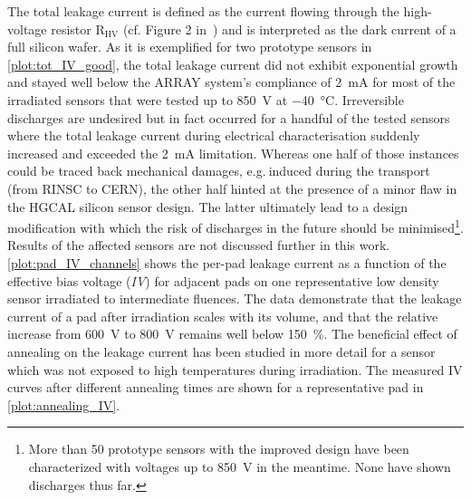 The total leakage current is defined as the current flowing through the high-voltage resistor R$_\text{HV}$ (cf. Figure 2 in~\cite{pitters:array2019}) and is interpreted as the dark current of a full silicon wafer.
As it is exemplified for two prototype sensors in \ref{plot:tot_IV_good}, the total leakage current did not exhibit exponential growth and stayed well below the ARRAY system's compliance of \SI{2}{\milli\ampere} for most of the irradiated sensors that were tested up to \SI{850}{\volt} at \SI{-40}{\celsius}.
Irreversible discharges are undesired but in fact occurred for a handful of the tested sensors where the total leakage current during electrical characterisation suddenly increased and exceeded the \SI{2}{\milli\ampere} limitation.
Whereas one half of those instances could be traced back mechanical damages, e.g.$~$induced during the transport (from RINSC to CERN), the other half hinted at the presence of a minor flaw in the HGCAL silicon sensor design.
The latter ultimately lead to a design modification with which the risk of discharges in the future should be minimised\footnote{More than 50 prototype sensors with the improved design have been characterized with voltages up to \SI{850}{\volt} in the meantime. None have shown discharges thus far.}.
Results of the affected sensors are not discussed further in this work.
\ref{plot:pad_IV_channels} shows the per-pad leakage current as a function of the effective bias voltage (\emph{IV}) for adjacent pads on one representative low density sensor irradiated to intermediate fluences.
The data demonstrate that the leakage current of a pad after irradiation scales with its volume, and that the relative increase from \SI{600}{\volt} to \SI{800}{\volt} remains well below \SI{150}{\percent}.
The beneficial effect of annealing on the leakage current has been studied in more detail for a sensor which was not exposed to high temperatures during irradiation.
The measured IV curves after different annealing times are shown for a representative pad in \ref{plot:annealing_IV}.

